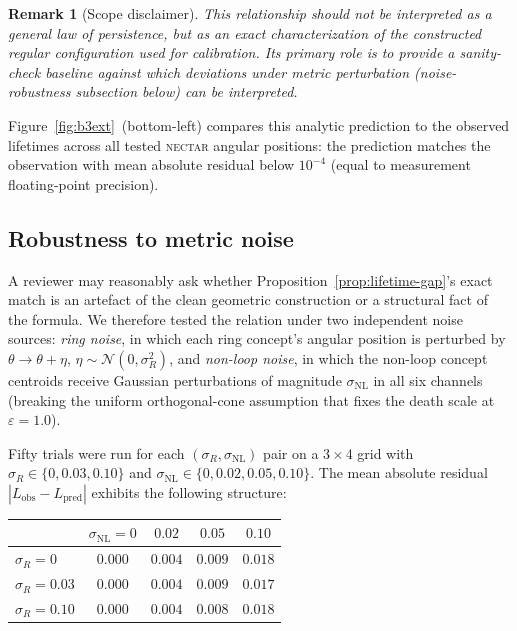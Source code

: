 \documentclass[12pt]{article}
\newtheorem{remark}{Remark}
\begin{document}
\begin{remark}[Scope disclaimer]
This relationship should not be interpreted as a general law of
persistence, but as an exact characterization of the constructed
regular configuration used for calibration. Its primary role is to
provide a sanity-check baseline against which deviations under metric
perturbation (noise-robustness subsection below) can be interpreted.
\end{remark}

Figure~\ref{fig:b3ext}~(bottom-left) compares this analytic
prediction to the observed lifetimes across all tested
\textsc{nectar} angular positions: the prediction matches the
observation with mean absolute residual below $10^{-4}$
(equal to measurement floating-point precision).

\subsection*{Robustness to metric noise}

A reviewer may reasonably ask whether
Proposition~\ref{prop:lifetime-gap}'s exact match is an artefact of
the clean geometric construction or a structural fact of the
formula. We therefore tested the relation under two independent
noise sources: \emph{ring noise}, in which each ring concept's
angular position is perturbed by $\theta \to \theta + \eta$,
$\eta \sim \mathcal{N}(0, \sigma_R^2)$, and \emph{non-loop noise},
in which the non-loop concept centroids receive Gaussian
perturbations of magnitude $\sigma_\mathrm{NL}$ in all six channels
(breaking the uniform orthogonal-cone assumption that fixes the
death scale at $\varepsilon = 1.0$).

Fifty trials were run for each $(\sigma_R, \sigma_\mathrm{NL})$
pair on a $3 \times 4$ grid with $\sigma_R \in \{0, 0.03, 0.10\}$
and $\sigma_\mathrm{NL} \in \{0, 0.02, 0.05, 0.10\}$. The mean
absolute residual $|L_\mathrm{obs} - L_\mathrm{pred}|$ exhibits
the following structure:

\begin{center}
\begin{tabular}{l|cccc}
\hline
 & $\sigma_\mathrm{NL} = 0$ & $0.02$ & $0.05$ & $0.10$ \\
\hline
$\sigma_R = 0$    & $0.000$ & $0.004$ & $0.009$ & $0.018$ \\
$\sigma_R = 0.03$ & $0.000$ & $0.004$ & $0.009$ & $0.017$ \\
$\sigma_R = 0.10$ & $0.000$ & $0.004$ & $0.008$ & $0.018$ \\
\hline
\end{tabular}
\end{center}
\end{document}
